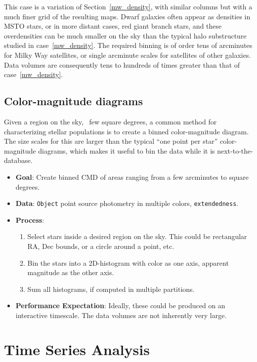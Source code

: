 \documentclass[DM,authoryear,toc]{lsstdoc}
\begin{document}
This case is a variation of Section~\ref{mw_density}, with similar columns but with
a much finer grid of the resulting maps. Dwarf galaxies often appear as
densities in MSTO stars, or in more distant cases, red giant branch stars, and
these overdensities can be much smaller on the sky than the typical halo
substructure studied in case~\ref{mw_density}. The required binning is of order
tens of arcminutes for Milky Way satellites, or single arcminute scales for
satellites of other galaxies. Data volumes are consequently tens to hundreds of
times greater than that of case~\ref{mw_density}.

\subsection{Color-magnitude diagrams}

Given a region on the sky, ~few square degrees, a common method for characterizing
stellar populations is to create a binned color-magnitude diagram. The size
scales for this are larger than the typical ``one point per star''
color-magnitude diagrams, which makes it useful to bin the data while it is
next-to-the-database.

\begin{itemize}
  \item \textbf{Goal}: Create binned CMD of areas ranging from a few arcminutes
  to square degrees.
  \item \textbf{Data}: \texttt{Object} point source photometry in multiple
  colors, \texttt{extendedness}.
  \item \textbf{Process}:
    \begin{enumerate}
      \item Select stars inside a desired region on the sky. This could be
      rectangular RA, Dec bounds, or a circle around a point, etc.
      \item Bin the stars into a 2D-histogram with color as one axis, apparent
      magnitude as the other axis.
      \item Sum all histograms, if computed in multiple partitions.
    \end{enumerate}
  \item \textbf{Performance Expectation}: Ideally, these could be produced on an
  interactive timescale. The data volumes are not inherently very large.
\end{itemize}

\section{Time Series Analysis}
\end{document}
